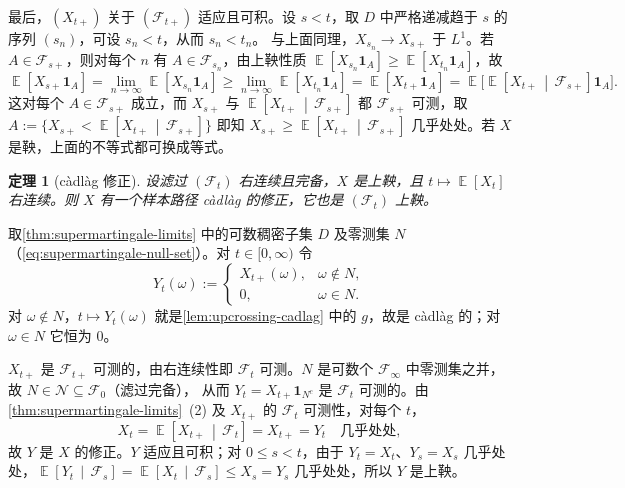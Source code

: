\documentclass[UTF8,11pt,a4paper,oneside,fontset=fandol]{ctexrep}
\makeatletter
\numberwithin{equation}{section}
\theoremstyle{zhthm}
\newtheorem{theorem}{定理}[section]
\renewenvironment{proof}[1][\proofname]{\par
  \pushQED{\qed}%
  \normalfont\topsep6\p@\@plus6\p@\relax
  \trivlist
  \item[\hskip\labelsep\bfseries#1\hspace{0.5em}]\ignorespaces
}{%
  \popQED\endtrivlist\@endpefalse
}
\renewcommand{\proofname}{证明}
\newcommand{\F}{\mathcal{F}}
\DeclareMathOperator{\E}{\mathbb{E}}
\newcommand{\ind}[1]{\mathbf{1}_{#1}}
\newcommand{\Econd}[2]{%
  \E\!\left[#1\,\middle|\,#2\right]}
\makeatother
\begin{document}
\begin{proof}
最后，$(X_{t+})$ 关于 $(\F_{t+})$ 适应且可积。设 $s<t$，取 $D$ 中严格递减趋于 $s$ 的序列 $(s_n)$，可设 $s_n<t$，从而 $s_n<t_n$。
与上面同理，$X_{s_n}\to X_{s+}$ 于 $L^1$。若 $A\in\F_{s+}$，则对每个 $n$ 有 $A\in\F_{s_n}$，由上鞅性质 $\E[X_{s_n}\ind A]\ge\E[X_{t_n}\ind A]$，故
\[
  \E[X_{s+}\ind A]=\lim_{n\to\infty}\E[X_{s_n}\ind A]\ge\lim_{n\to\infty}\E[X_{t_n}\ind A]=\E[X_{t+}\ind A]=\E\bigl[\Econd{X_{t+}}{\F_{s+}}\ind A\bigr].
\]
这对每个 $A\in\F_{s+}$ 成立，而 $X_{s+}$ 与 $\Econd{X_{t+}}{\F_{s+}}$ 都 $\F_{s+}$ 可测，取 $A:=\{X_{s+}<\Econd{X_{t+}}{\F_{s+}}\}$ 即知
$X_{s+}\ge\Econd{X_{t+}}{\F_{s+}}$ 几乎处处。若 $X$ 是鞅，上面的不等式都可换成等式。
\end{proof}

\begin{theorem}[càdlàg 修正]
\label{thm:supermartingale-cadlag-modification}
设滤过 $(\F_t)$ 右连续且完备，$X$ 是上鞅，且 $t\mapsto\E[X_t]$ 右连续。则 $X$ 有一个样本路径 càdlàg 的修正，它也是 $(\F_t)$ 上鞅。
\end{theorem}

\begin{proof}
取\cref{thm:supermartingale-limits} 中的可数稠密子集 $D$ 及零测集 $N$（\cref{eq:supermartingale-null-set}）。对 $t\in[0,\infty)$ 令
\[
  Y_t(\omega):=
  \begin{cases}
    X_{t+}(\omega), & \omega\notin N,\\
    0, & \omega\in N.
  \end{cases}
\]
对 $\omega\notin N$，$t\mapsto Y_t(\omega)$ 就是\cref{lem:upcrossing-cadlag} 中的 $g$，故是 càdlàg 的；对 $\omega\in N$ 它恒为 $0$。

$X_{t+}$ 是 $\F_{t+}$ 可测的，由右连续性即 $\F_t$ 可测。$N$ 是可数个 $\F_\infty$ 中零测集之并，故 $N\in\mathcal N\subseteq\F_0$（滤过完备），
从而 $Y_t=X_{t+}\ind{N^c}$ 是 $\F_t$ 可测的。由\cref{thm:supermartingale-limits}~(2) 及 $X_{t+}$ 的 $\F_t$ 可测性，对每个 $t$，
\[
  X_t=\Econd{X_{t+}}{\F_t}=X_{t+}=Y_t\quad\text{几乎处处},
\]
故 $Y$ 是 $X$ 的修正。$Y$ 适应且可积；对 $0\le s<t$，由于 $Y_t=X_t$、$Y_s=X_s$ 几乎处处，$\Econd{Y_t}{\F_s}=\Econd{X_t}{\F_s}\le X_s=Y_s$ 几乎处处，所以 $Y$ 是上鞅。
\end{proof}
\end{document}
